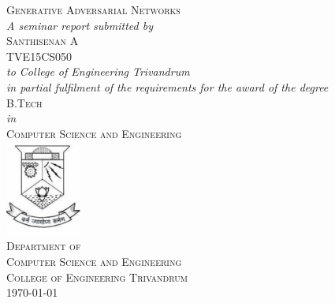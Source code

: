 \documentclass[12pt, a4paper]{report}
\begin{document}
    \begin{titlepage}
        \newcommand{\HRule}{\rule{\linewidth}{0.5mm}}
        \begin{center}
            \textsc{\LARGE{Generative Adversarial Networks}}\\[0.75cm]
            \textit{A seminar report submitted by} \\[0.25cm]
            \textsc{\Large{Santhisenan A}} \\[0.25cm]
            \textsc{TVE15CS050} \\[0.75cm]
            \textit{to College of Engineering Trivandrum \\[0.25cm] in partial 
            fulfilment of the requirements for the award of the degree}\\[0.75cm]
            \textsc{\Large B.Tech}\\[0.5cm]
            \textit{in}\\[0.5cm]
            \textsc{\LARGE Computer Science and Engineering}\\[0.75cm]
            \includegraphics[width=2.5cm]{images/emblem.pdf}\\[1cm]

            \textsc{\Large{Department of \\[0.25cm] Computer Science and Engineering}}\\
            [0.75cm]
            \textsc{\large{College of Engineering Trivandrum}}\\[0.75cm]
            \monthyeardate\today
        \end{center}
    \end{titlepage}
\end{document}
